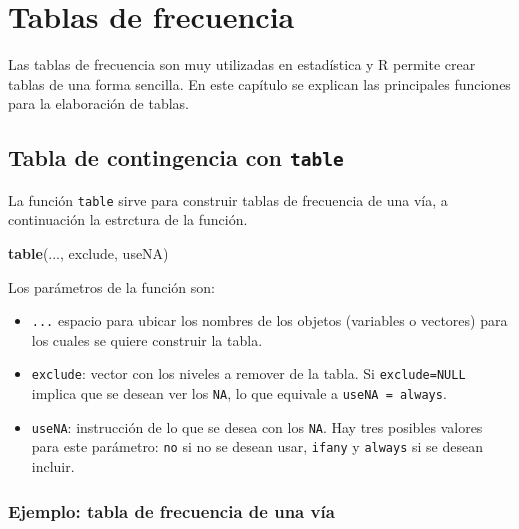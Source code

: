 \documentclass[10pt,]{krantz}
\makeatletter
\newenvironment{Shaded}{\begin{snugshade}}{\end{snugshade}}
\newcommand{\KeywordTok}[1]{\textcolor[rgb]{0.13,0.29,0.53}{\textbf{#1}}}
\newcommand{\NormalTok}[1]{#1}
\providecommand{\tightlist}{%
  \setlength{\itemsep}{0pt}\setlength{\parskip}{0pt}}
\newenvironment{kframe}{%
\medskip{}
\setlength{\fboxsep}{.8em}
 \def\at@end@of@kframe{}%
 \ifinner\ifhmode%
  \def\at@end@of@kframe{\end{minipage}}%
  \begin{minipage}{\columnwidth}%
 \fi\fi%
 \def\FrameCommand##1{\hskip\@totalleftmargin \hskip-\fboxsep
 \colorbox{shadecolor}{##1}\hskip-\fboxsep
     \hskip-\linewidth \hskip-\@totalleftmargin \hskip\columnwidth}%
 \MakeFramed {\advance\hsize-\width
   \@totalleftmargin\z@ \linewidth\hsize
   \@setminipage}}%
 {\par\unskip\endMakeFramed%
 \at@end@of@kframe}
\renewenvironment{Shaded}{\begin{kframe}}{\end{kframe}}
\makeatother
\begin{document}
\section{Tablas de frecuencia}\label{tablas}

Las tablas de frecuencia son muy utilizadas en estadística y R permite
crear tablas de una forma sencilla. En este capítulo se explican las
principales funciones para la elaboración de tablas.

\subsection{\texorpdfstring{Tabla de contingencia con \texttt{table}
}{Tabla de contingencia con table }}\label{tabla-de-contingencia-con-table}

La función \texttt{table} sirve para construir tablas de frecuencia de
una vía, a continuación la estrctura de la función.

\begin{Shaded}
\begin{Highlighting}[]
\KeywordTok{table}\NormalTok{(..., exclude, useNA)}
\end{Highlighting}
\end{Shaded}

Los parámetros de la función son:

\begin{itemize}
\tightlist
\item
  \texttt{...} espacio para ubicar los nombres de los objetos (variables
  o vectores) para los cuales se quiere construir la tabla.
\item
  \texttt{exclude}: vector con los niveles a remover de la tabla. Si
  \texttt{exclude=NULL} implica que se desean ver los \texttt{NA}, lo
  que equivale a
  \texttt{useNA\ =\ \textquotesingle{}always\textquotesingle{}}.
\item
  \texttt{useNA}: instrucción de lo que se desea con los \texttt{NA}.
  Hay tres posibles valores para este parámetro:
  \texttt{\textquotesingle{}no\textquotesingle{}} si no se desean usar,
  \texttt{\textquotesingle{}ifany\textquotesingle{}} y
  \texttt{\textquotesingle{}always\textquotesingle{}} si se desean
  incluir.
\end{itemize}

\subsubsection*{Ejemplo: tabla de frecuencia de una
vía}\label{ejemplo-tabla-de-frecuencia-de-una-via}
\end{document}
